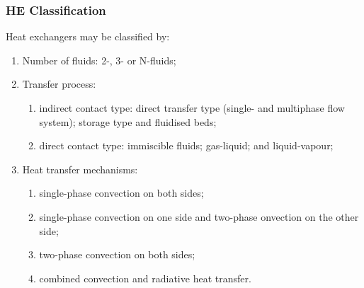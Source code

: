 \documentclass[10pt,compress,unknownkeysallowed]{beamer}
\begin{document}
\begin{frame}
 \frametitle{HE Classification}
    Heat exchangers may be classified by:
      \begin{enumerate}%
          \item<1-> Number of fluids: 2-, 3- or N-fluids;
          \item<2-> Transfer process:
             \begin{enumerate}
                 \item<2-> indirect contact type: direct transfer type (\ie single- and multiphase flow system); storage type and fluidised beds;
                 \item<2-> direct contact type: immiscible fluids; gas-liquid; and liquid-vapour;
             \end{enumerate}
          \item<3-> Heat transfer mechanisms:
             \begin{enumerate}
                 \item<3-> single-phase convection on both sides;  
                 \item<3-> single-phase convection on one side and two-phase onvection on the other side; 
                 \item<3-> two-phase convection on both sides;
                 \item<3-> combined convection and radiative heat transfer.
             \end{enumerate}
   \end{enumerate}
\end{frame}
\end{document}
